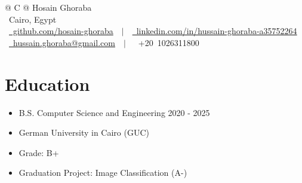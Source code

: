 \documentclass[a4paper,11pt]{article}
\begin{document}
\pagestyle{empty}

\begin{tabularx}{\linewidth}{@{} C @{}}
    \Huge{Hosain Ghoraba} \\ [5pt]
    {\faMapMarker\ Cairo, Egypt} \\ [4pt]
    \mbox {
    \href{https://github.com/hosain-ghoraba}{\raisebox{-0.05\height}\faGithub\ github.com/hosain-ghoraba} \ $|$ \
    \href{https://www.linkedin.com/in/hussain-ghoraba-a35752264/}{\raisebox{-0.05\height}\faLinkedin\ linkedin.com/in/hussain-ghoraba-a35752264}
    } \\ [3pt]
    \mbox {
    \href{mailto:hussain.ghoraba@gmail.com}{\raisebox{-0.05\height}\faEnvelope\ hussain.ghoraba@gmail.com} \ $|$ \
    {\raisebox{-0.05\height}\faMobile\ +20 1026311800}
    }
\end{tabularx}

\section{\textbf{Education}}
\begin{itemize}
    \item B.S. Computer Science and Engineering \hfill {2020 - 2025}
    \item {German University in Cairo (GUC)} 
    \item Grade: B+ 
    \item Graduation Project: Image Classification (A-)
\end{itemize}

\end{document}

